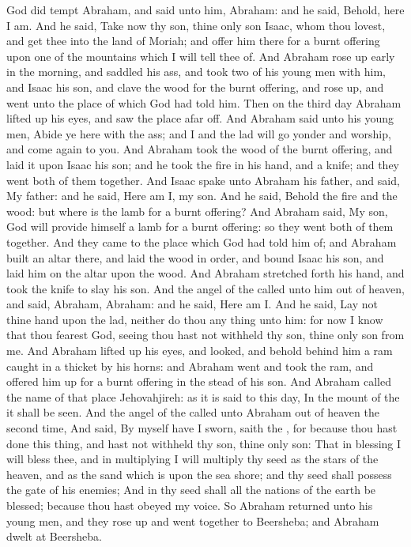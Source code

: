  God did tempt Abraham, and said unto him, Abraham: and he said, Behold, here I am. And he said, Take now thy son, thine only son Isaac, whom thou lovest, and get thee into the land of Moriah; and offer him there for a burnt offering upon one of the mountains which I will tell thee of. And Abraham rose up early in the morning, and saddled his ass, and took two of his young men with him, and Isaac his son, and clave the wood for the burnt offering, and rose up, and went unto the place of which God had told him. Then on the third day Abraham lifted up his eyes, and saw the place afar off. And Abraham said unto his young men, Abide ye here with the ass; and I and the lad will go yonder and worship, and come again to you. And Abraham took the wood of the burnt offering, and laid it upon Isaac his son; and he took the fire in his hand, and a knife; and they went both of them together. And Isaac spake unto Abraham his father, and said, My father: and he said, Here am I, my son. And he said, Behold the fire and the wood: but where is the lamb for a burnt offering? And Abraham said, My son, God will provide himself a lamb for a burnt offering: so they went both of them together. And they came to the place which God had told him of; and Abraham built an altar there, and laid the wood in order, and bound Isaac his son, and laid him on the altar upon the wood. And Abraham stretched forth his hand, and took the knife to slay his son. And the angel of the  called unto him out of heaven, and said, Abraham, Abraham: and he said, Here am I. And he said, Lay not thine hand upon the lad, neither do thou any thing unto him: for now I know that thou fearest God, seeing thou hast not withheld thy son, thine only son from me. And Abraham lifted up his eyes, and looked, and behold behind him a ram caught in a thicket by his horns: and Abraham went and took the ram, and offered him up for a burnt offering in the stead of his son. And Abraham called the name of that place Jehovahjireh: as it is said to this day, In the mount of the  it shall be seen. And the angel of the  called unto Abraham out of heaven the second time, And said, By myself have I sworn, saith the , for because thou hast done this thing, and hast not withheld thy son, thine only son: That in blessing I will bless thee, and in multiplying I will multiply thy seed as the stars of the heaven, and as the sand which is upon the sea shore; and thy seed shall possess the gate of his enemies; And in thy seed shall all the nations of the earth be blessed; because thou hast obeyed my voice. So Abraham returned unto his young men, and they rose up and went together to Beersheba; and Abraham dwelt at Beersheba.

